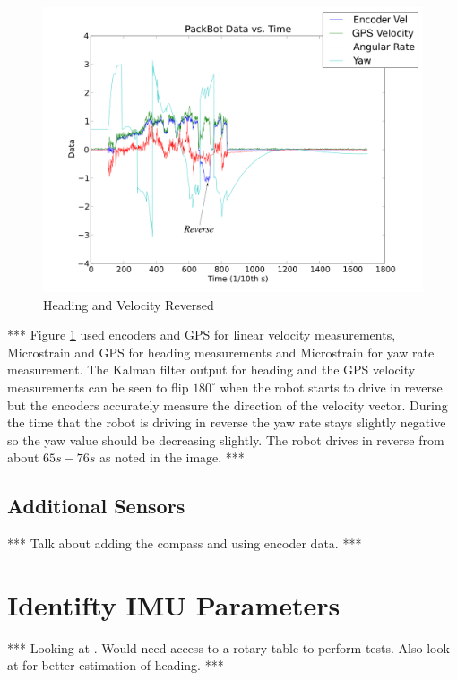\begin{figure}[ht!]
	\centering
	\includegraphics[width=.8\textwidth]{images/pbDataReverseHeading}
	\caption{Heading and Velocity Reversed}
	\label{fig:pbDataReverseHeading}
\end{figure}

*** Figure \ref{fig:pbDataReverseHeading} used encoders and GPS for linear velocity measurements, Microstrain and GPS for heading measurements and Microstrain for yaw rate measurement. The Kalman filter output for heading and the GPS velocity measurements can be seen to flip $180^\circ$ when the robot starts to drive in reverse but the encoders accurately measure the direction of the velocity vector. During the time that the robot is driving in reverse the yaw rate stays slightly negative so the yaw value should be decreasing slightly. The robot drives in reverse from about $65 s - 76s$ as noted in the image. ***

\subsection{Additional Sensors}
\label{sec:kfAdditionalSensors}
*** Talk about adding the compass and using encoder data. ***

\section{Identifty IMU Parameters}
\label{sec:identifyimuparams}
*** Looking at \cite{ChungOjeda01}. Would need access to a rotary table to perform tests. Also look at \cite{ParkinsonHeadingEstimation01} for better estimation of heading. ***

